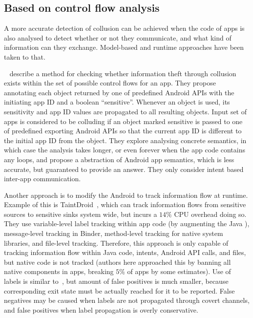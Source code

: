 \documentclass[article, oneside]{aaltoseries}
\renewcommand\gls\cgls \renewcommand\glspl\cglspl %
\begin{document}
\subsection{Based on control flow analysis}
\label{sec:flow}

A more accurate detection of collusion can be achieved when
the code of apps is also analysed to detect whether or not
they communicate, and what kind of information can they
exchange. Model-based and runtime approaches have been taken
to that.

\citeauthor{Asavoae2018}~\cite{Asavoae2018} describe a
method for checking whether information theft through
collusion exists within the set of possible control flows
for an app. They propose annotating each object returned by
one of predefined Android APIs with the initiating app ID
and a boolean ``sensitive''. Whenever an object is used, its
sensitivity and app ID values are propagated to all
resulting objects. Input set of apps is considered to be
colluding if an object marked sensitive is passed to one of
predefined exporting Android APIs so that the current app ID
is different to the initial app ID from the object. They
explore analysing concrete semantics, in which case the
analysis takes longer, or even forever when the app code
contains any loops, and propose a abstraction of Android app
semantics, which is less accurate, but guaranteed to provide
an answer. They only consider intent based inter-app
communication.

Another approach is to modify the Android \gls{os} to track
information flow at runtime. Example of this is
TaintDroid~\cite{Enck2014}, which can track information
flows from sensitive sources to sensitive sinks system wide,
but incurs a $14\%$ CPU overhead doing so. They use
variable-level label tracking within app code (by augmenting
the Java \gls{vm}), message-level tracking in Binder,
method-level tracking for native system libraries, and
file-level tracking. Therefore, this approach is only
capable of tracking information flow within Java code,
intents, Android API calls, and files, but native code is
not tracked (authors here approached this by banning all
native components in apps, breaking $5\%$ of apps by some
estimates). Use of labels is similar
to~\cite{Asavoae2018}, but amount of false positives is much
smaller, because corresponding exit state must be actually
reached for it to be reported. False negatives may be caused
when labels are not propagated through covert channels, and
false positives when label propagation is overly
conservative.
\end{document}

